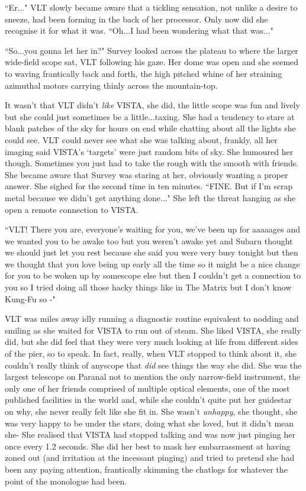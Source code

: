 \documentclass[12pt]{iopart}
\begin{document}
``Er..." VLT slowly became aware that a tickling sensation, not unlike a desire to sneeze, had been forming in the back of her processor. Only now did she recognise it for what it was. ``Oh...I had been wondering what that was..."

``So...you gonna let her in?" Survey looked across the plateau to where the larger wide-field scope sat, VLT following his gaze. Her dome was open and she seemed to waving frantically back and forth, the high pitched whine of her straining azimuthal motors carrying thinly across the mountain-top.

It wasn't that VLT didn't \emph{like} VISTA, she did, the little scope was fun and lively but she could just sometimes be a little...taxing. She had a tendency to stare at blank patches of the sky for hours on end while chatting about all the lights she could see. VLT could never see what she was talking about, frankly, all her imaging said VISTA's `targets' were just random bits of sky. She humoured her though. Sometimes you just had to take the rough with the smooth with friends. She became aware that Survey was staring at her, obviously wanting a proper answer. She sighed for the second time in ten minutes. ``FINE. But if I'm scrap metal because we didn't get anything done..." She left the threat hanging as she open a remote connection to VISTA.

``VLT! There you are, everyone's waiting for you, we've been up for aaaaages and we wanted you to be awake too but you weren't awake yet and Subaru thought we should just let you rest because she said you were very busy tonight but then we thought that you love being up early all the time so it might be a nice change for you to be woken up by somescope else but then I couldn't get a connection to you so I tried doing all those hacky things like in The Matrix but I don't know Kung-Fu so -"

VLT was miles away idly running a diagnostic routine equivalent to nodding and smiling as she waited for VISTA to run out of steam. She liked VISTA, she really did, but she did feel that they were very much looking at life from different sides of the pier, so to speak. In fact, really, when VLT stopped to think about it, she couldn't really think of anyscope that \emph{did} see things the way she did. She was the largest telescope on Paranal not to mention the only narrow-field instrument, the only one of her friends comprised of multiple optical elements, one of the most published facilities in the world and, while she couldn't quite put her guidestar on why, she never really felt like she fit in. She wasn't \emph{unhappy}, she thought, she was very happy to be under the stars, doing what she loved, but it didn't mean she- She realised that VISTA had stopped talking and was now just pinging her once every 1.2 seconds. She did her best to mask her embarrassment at having zoned out (and irritation at the incessant pinging) and tried to pretend she had been any paying attention, frantically skimming the chatlogs for whatever the point of the monologue had been.
\end{document}
